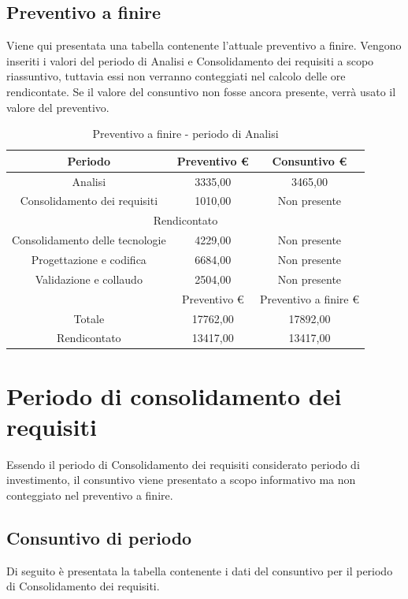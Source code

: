 \documentclass[./PianodiProgetto.tex]{subfiles}
\begin{document}
\subsection{Preventivo a finire}
Viene qui presentata una tabella contenente l'attuale preventivo a finire.
Vengono inseriti i valori del periodo di Analisi e Consolidamento dei requisiti a scopo riassuntivo, tuttavia essi non verranno conteggiati nel calcolo delle ore rendicontate. Se il valore del consuntivo non fosse ancora presente, verrà usato il valore del preventivo.

\begin{table}[H]
	\centering
	\begin{tabular}{|c|c|c|}
		\hline
		Periodo&Preventivo \euro{}&Consuntivo \euro{} \\ \hline
		Analisi&3335,00&3465,00  \\ \hline
		Consolidamento dei requisiti&1010,00&Non presente  \\ \hline
		\multicolumn{3}{|c|}{Rendicontato}  \\ \hline
		Consolidamento delle tecnologie&4229,00&Non presente  \\ \hline
		Progettazione e codifica&6684,00&Non presente  \\ \hline
		Validazione e collaudo&2504,00&Non presente  \\ \hline
		&Preventivo \euro{}&Preventivo a finire \euro{}  \\ \hline
		Totale&17762,00&17892,00 \\ \hline
		Rendicontato&13417,00&13417,00 \\ \hline
	\end{tabular}
	\caption{Preventivo a finire - periodo di Analisi}
\end{table}

\section{Periodo di consolidamento dei requisiti}
Essendo il periodo di Consolidamento dei requisiti considerato periodo di investimento, il consuntivo viene presentato a scopo informativo ma non conteggiato nel preventivo a finire.

\subsection{Consuntivo di periodo}
Di seguito è presentata la tabella contenente i dati del consuntivo per il
periodo di Consolidamento dei requisiti.
\end{document}
